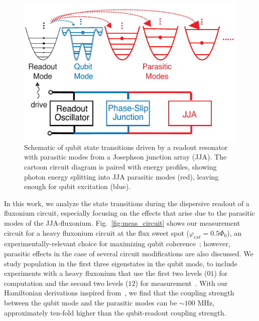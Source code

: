 \documentclass[prx,showpacs,notitlepage,twocolumn,superscriptaddress,nofootinbib,preprintnumbers,floatfix]{revtex4-2}
\begin{document}


\begin{figure}
    \centering
    \includegraphics[width=\linewidth]{Figures/Demo.pdf}
    \caption{Schematic of qubit state transitions driven by a readout resonator with parasitic modes from a Josephson junction array (JJA). The cartoon circuit diagram is paired with energy profiles, showing photon energy splitting into JJA parasitic modes (red), leaving enough for qubit excitation (blue).}
    \label{fig:demo}
\end{figure}
In this work, we analyze the state transitions during the dispersive readout of a fluxonium circuit, especially focusing on the effects that arise due to the parasitic modes of the JJA-fluxonium. Fig.~\ref{fig:meas_circuit} shows our measurement circuit for a heavy fluxonium circuit at the flux sweet spot  ($\varphi_{ext}=0.5\Phi_0$), an experimentally-relevant choice for maximizing qubit coherence~\cite{somoroff_millisecond_2023,nguyen2019high,zhang_universal_2021,manucharyan2009fluxonium}; however, parasitic effects in the case of several circuit modifications are also discussed. We study population in the first three eigenstates in the qubit mode, to include experiments with a heavy fluxonium that use the first two levels ($01$) for computation and the second two levels ($12$) for measurement~\cite{zhang_universal_2021}. %
With our Hamiltonian derivations inspired from~\cite{viola2015collective}, we find that the coupling strength between the qubit mode and the parasitic modes can be $\sim 100$ MHz, approximately ten-fold higher than the qubit-readout coupling strength. %
\end{document}

